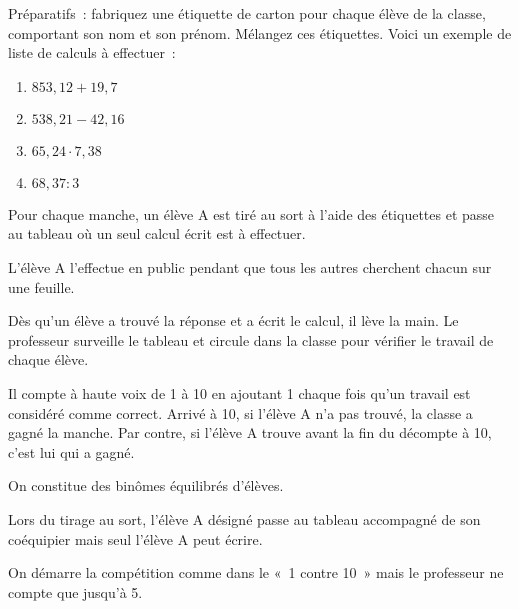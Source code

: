 \begin{TP}
Préparatifs : fabriquez une étiquette de carton pour chaque élève de la classe, comportant son nom et son prénom. Mélangez ces étiquettes.
Voici un exemple de liste de calculs à effectuer :
\begin{enumerate}
 \item $853,12 + 19,7$
 \item $538,21 - 42,16$
 \item $65,24 \cdot 7,38$
 \item $68,37 : 3$
 \end{enumerate}

Pour chaque manche, un élève A est tiré au sort à l'aide des étiquettes et passe au tableau où un seul calcul écrit est à effectuer. 

L'élève A l'effectue en public pendant que tous les autres cherchent chacun sur une feuille. 

Dès qu'un élève a trouvé la réponse et a écrit le calcul, il lève la main. Le professeur surveille le tableau et circule dans la classe pour vérifier le travail de chaque élève. 

Il compte à haute voix de 1 à 10 en ajoutant 1 chaque fois qu'un travail est considéré comme correct. 
Arrivé à 10, si l'élève A n'a pas trouvé, la classe a gagné la manche. Par contre, si l'élève A trouve avant la fin du décompte à 10, c'est lui qui a gagné.

On constitue des binômes équilibrés d'élèves.

Lors du tirage au sort, l'élève A désigné passe au tableau accompagné de son coéquipier mais seul l'élève A peut écrire. 

On démarre la compétition comme dans le « 1 contre 10 » mais le professeur ne compte que jusqu'à 5. 
\end{TP}